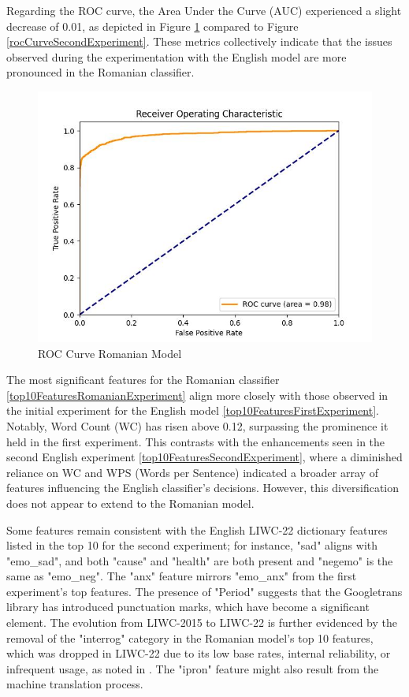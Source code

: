 Regarding the ROC curve, the Area Under the Curve (AUC) experienced a slight decrease of 0.01, as depicted in Figure \ref{rocCurveRomanianExperiment} compared to Figure \ref{rocCurveSecondExperiment}. These metrics collectively indicate that the issues observed during the experimentation with the English model are more pronounced in the Romanian classifier.

\begin{figure}[htbp]
	\centering
		\includegraphics[scale=0.8]{LaTeX Bachelor Thesis Depression Signs Detection/figures/metrics/experimentRomanian/roc_curve.jpg}
	\caption{ROC Curve Romanian Model}
	\label{rocCurveRomanianExperiment}
\end{figure}

The most significant features for the Romanian classifier \ref{top10FeaturesRomanianExperiment} align more closely with those observed in the initial experiment for the English model \ref{top10FeaturesFirstExperiment}. Notably, Word Count (WC) has risen above 0.12, surpassing the prominence it held in the first experiment. This contrasts with the enhancements seen in the second English experiment \ref{top10FeaturesSecondExperiment}, where a diminished reliance on WC and WPS (Words per Sentence) indicated a broader array of features influencing the English classifier’s decisions. However, this diversification does not appear to extend to the Romanian model.

Some features remain consistent with the English LIWC-22 dictionary features listed in the top 10 for the second experiment; for instance, "sad" aligns with "emo\_sad", and both "cause" and "health" are both present and "negemo" is the same as "emo\_neg". The "anx" feature mirrors "emo\_anx" from the first experiment’s top features. The presence of "Period" suggests that the Googletrans library has introduced punctuation marks, which have become a significant element. The evolution from LIWC-2015 to LIWC-22 is further evidenced by the removal of the "interrog" category in the Romanian model’s top 10 features, which was dropped in LIWC-22 due to its low base rates, internal reliability, or infrequent usage, as noted in \cite{boyd2022development}. The "ipron" feature might also result from the machine translation process.

